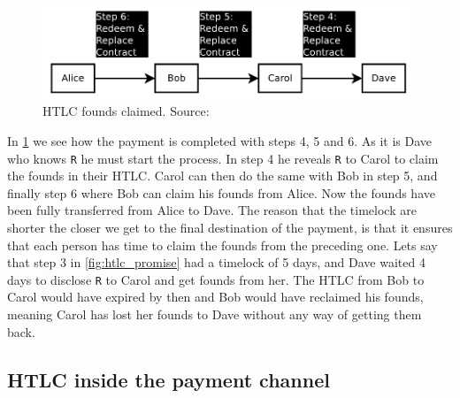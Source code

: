 \begin{figure}[ht]
    \centering
    \includegraphics[width=11cm]{figures/htlc_settle.png}
    \caption{HTLC founds claimed. Source:~\cite{poon2015bitcoin}}
    \label{fig:htlc_settle}
\end{figure}

In \cref{fig:htlc_settle} we see how the payment is completed with steps 4, 5 and 6. As it is Dave who knows {\tt R} he must start the process. In step 4 he reveals {\tt R} to Carol to claim the founds in their HTLC. Carol can then do the same with Bob in step 5, and finally step 6 where Bob can claim his founds from Alice.
Now the founds have been fully transferred from Alice to Dave.
The reason that the timelock are shorter the closer we get to the final destination of the payment, is that it ensures that each person has time to claim the founds from the preceding one. Lets say that step 3 in \cref{fig:htlc_promise} had a timelock of 5 days, and Dave waited 4 days to disclose {\tt R} to Carol and get founds from her. The HTLC from Bob to Carol would have expired by then and Bob would have reclaimed his founds, meaning Carol has lost her founds to Dave without any way of getting them back.



\subsection{HTLC inside the payment channel}
\label{subsec:htlcln}

